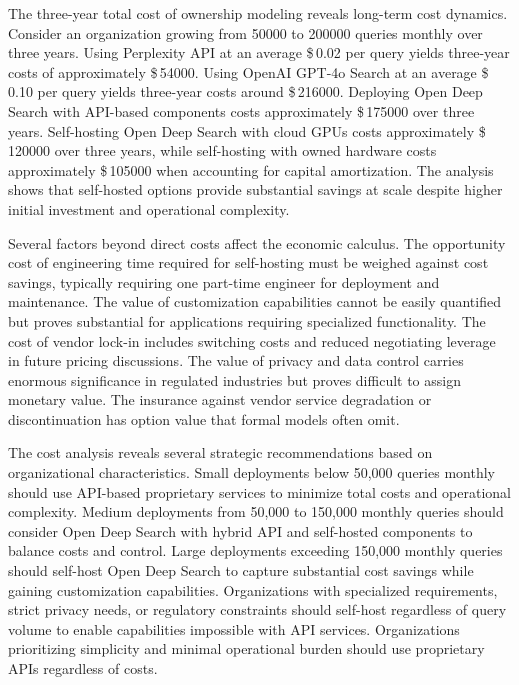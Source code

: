 The three-year total cost of ownership modeling reveals long-term cost dynamics. Consider an organization growing from \num{50000} to \num{200000} queries monthly over three years. Using Perplexity API at an average \$\,\num{0.02} per query yields three-year costs of approximately \$\,\num{54000}. Using OpenAI GPT-4o Search at an average \$\,\num{0.10} per query yields three-year costs around \$\,\num{216000}. Deploying Open Deep Search with API-based components costs approximately \$\,\num{175000} over three years. Self-hosting Open Deep Search with cloud GPUs costs approximately \$\,\num{120000} over three years, while self-hosting with owned hardware costs approximately \$\,\num{105000} when accounting for capital amortization. The analysis shows that self-hosted options provide substantial savings at scale despite higher initial investment and operational complexity.

Several factors beyond direct costs affect the economic calculus. The opportunity cost of engineering time required for self-hosting must be weighed against cost savings, typically requiring one part-time engineer for deployment and maintenance. The value of customization capabilities cannot be easily quantified but proves substantial for applications requiring specialized functionality. The cost of vendor lock-in includes switching costs and reduced negotiating leverage in future pricing discussions. The value of privacy and data control carries enormous significance in regulated industries but proves difficult to assign monetary value. The insurance against vendor service degradation or discontinuation has option value that formal models often omit.

The cost analysis reveals several strategic recommendations based on organizational characteristics. Small deployments below 50,000 queries monthly should use API-based proprietary services to minimize total costs and operational complexity. Medium deployments from 50,000 to 150,000 monthly queries should consider Open Deep Search with hybrid API and self-hosted components to balance costs and control. Large deployments exceeding 150,000 monthly queries should self-host Open Deep Search to capture substantial cost savings while gaining customization capabilities. Organizations with specialized requirements, strict privacy needs, or regulatory constraints should self-host regardless of query volume to enable capabilities impossible with API services. Organizations prioritizing simplicity and minimal operational burden should use proprietary APIs regardless of costs.

